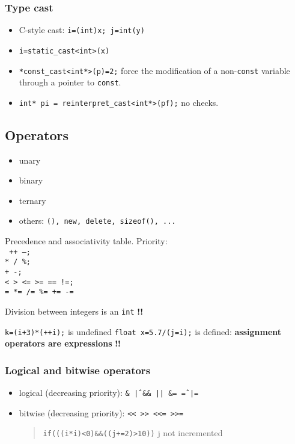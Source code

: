 \documentclass{article}
\newcommand{\code}[1]{\texttt {#1}}
\newcommand{\caut}{\textbf{!!}}
\begin{document}
\subsubsection{Type cast}
\begin{itemize}
 \item C-style cast: \texttt{i=(int)x; j=int(y)}
 \item \texttt{i=static\_cast<int>(x)}
 \item \code{*const\_cast<int*>(p)=2;} force the modification of a non-\texttt{const} variable through a pointer to \texttt{const}.
 \item \code{int* pi = reinterpret\_cast<int*>(pf);} no checks.
\end{itemize}



\subsection{Operators}
\begin{itemize}
 \item unary
 \item binary
 \item ternary
 \item others: \texttt{(), new, delete, sizeof(), ...}
\end{itemize}
Precedence and associativity table.
Priority: \\ 
\texttt{
++ --; \\
* / \%; \\
+ -; \\
< > <= >= == !=; \\
= *= /= \%= += -=
}

Division between integers is an \texttt{int} \caut

\texttt{k=(i+3)*(++i);} is undefined
\texttt{float x=5.7/(j=i);} is defined: \textbf{assignment operators are expressions} \caut

\subsubsection{Logical and bitwise operators}
\begin{itemize}
 \item logical (decreasing priority): \texttt{\& \^ | \&\& || \&= \^= |=}
 \item bitwise (decreasing priority): \texttt{<< >> <<= >>=}
\begin{quotation}
 \texttt{if(((i*i)<0)\&\&((j+=2)>10))} 
 j not incremented
\end{quotation}
\end{itemize}
\end{document}
